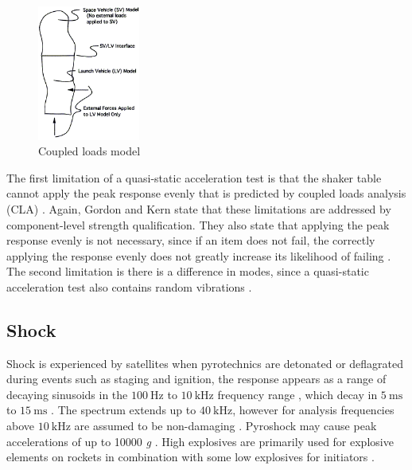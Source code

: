 \documentclass{report}
\begin{document}
\begin{figure}[H]
  \centering
  \includegraphics[width=0.3\textwidth]{images/cla.png}
  \caption{Coupled loads model \cite{dickens2001coupled}}
  \label{fig:cla}
\end{figure}

The first limitation of a quasi-static acceleration test is that the shaker table cannot apply the peak response evenly that is predicted by coupled loads analysis (CLA) \cite{gordon2015benefits}. Again, Gordon and Kern state that these limitations are addressed by component-level strength qualification. They also state that applying the peak response evenly is not necessary, since if an item does not fail, the correctly applying the response evenly does not greatly increase its likelihood of failing \cite{gordon2015benefits}. The second limitation is there is a difference in modes, since a quasi-static acceleration test also contains random vibrations \cite{gordon2015benefits}.

\subsection{Shock}

Shock is experienced by satellites when pyrotechnics are detonated or deflagrated during events such as staging and ignition, the response appears as a range of decaying sinusoids in the $\SI{100}{\hertz}$ to $\SI{10}{\kilo\hertz}$ frequency range \cite{brown_elements_2002}, which decay in $\SI{5}{\milli\second}$ to $\SI{15}{\milli\second}$ \cite{brown_elements_2002}. The spectrum extends up to $\SI{40}{\kilo\hertz}$, however for analysis frequencies above $\SI{10}{\kilo\hertz}$ are assumed to be non-damaging \cite{bement1995manual,nasa-pyroshock}. Pyroshock may cause peak accelerations of up to 10000 \textit{g} \cite{nasa-pyroshock}. High explosives are primarily used for explosive elements on rockets in combination with some low explosives for initiators \cite{bement1995manual}.
\end{document}
